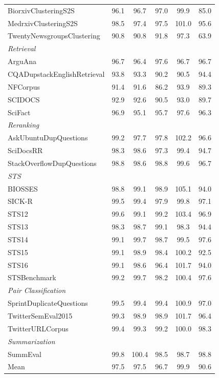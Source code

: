 \documentclass[11pt,a4paper]{article}
\begin{document}
\begin{table}[h]
{\begin{tabular}{@{}p{5.8cm}ccccc@{}}
        BiorxivClusteringS2S & 96.1 & 96.7 & 97.0 & 99.9 & 85.0 \\
        MedrxivClusteringS2S & 98.5 & 97.4 & 97.5 & 101.0 & 95.6 \\
        TwentyNewsgroupsClustering & 90.8 & 90.8 & 91.8 & 97.3 & 63.9 \\
        \midrule
        \multicolumn{6}{l}{\textit{Retrieval}} \\
        ArguAna & 96.7 & 96.4 & 97.6 & 96.7 & 96.7 \\
        CQADupstackEnglishRetrieval & 93.8 & 93.3 & 90.2 & 90.5 & 94.4 \\
        NFCorpus & 91.4 & 91.6 & 86.2 & 93.9 & 89.3 \\
        SCIDOCS & 92.9 & 92.6 & 90.5 & 93.0 & 89.7 \\
        SciFact & 96.9 & 95.1 & 95.7 & 97.6 & 96.3 \\
        \midrule
        \multicolumn{6}{l}{\textit{Reranking}} \\
        AskUbuntuDupQuestions & 99.2 & 97.7 & 97.8 & 102.2 & 96.6 \\
        SciDocsRR & 98.3 & 98.6 & 97.3 & 99.4 & 94.7 \\
        StackOverflowDupQuestions & 98.8 & 98.6 & 98.8 & 99.6 & 96.7 \\
        \midrule
        \multicolumn{6}{l}{\textit{STS}} \\
        BIOSSES & 98.8 & 99.1 & 98.9 & 105.1 & 94.0 \\
        SICK-R & 99.5 & 99.4 & 97.9 & 99.8 & 97.1 \\
        STS12 & 99.6 & 99.1 & 99.2 & 103.4 & 96.9 \\
        STS13 & 98.3 & 98.7 & 99.1 & 98.3 & 94.4 \\
        STS14 & 99.1 & 99.7 & 98.7 & 99.5 & 97.6 \\
        STS15 & 99.1 & 98.9 & 98.4 & 100.2 & 92.5 \\
        STS16 & 99.1 & 98.6 & 96.4 & 101.7 & 94.0 \\
        STSBenchmark & 99.2 & 99.7 & 98.2 & 100.4 & 97.6 \\
        \midrule
        \multicolumn{6}{l}{\textit{Pair Classification}} \\
        SprintDuplicateQuestions & 99.5 & 99.4 & 99.4 & 100.9 & 97.0 \\
        TwitterSemEval2015 & 99.3 & 98.9 & 98.9 & 101.7 & 96.4 \\
        TwitterURLCorpus & 99.4 & 99.3 & 99.2 & 100.0 & 98.3 \\
        \midrule
        \multicolumn{6}{l}{\textit{Summarization}} \\
        SummEval & 99.8 & 100.4 & 98.5 & 98.7 & 98.8 \\
        \midrule
        Mean & 97.5 & 97.5 & 96.7 & 99.9 & 90.6 \\
        \bottomrule
    \end{tabular}
    }
\end{table}
\end{document}
